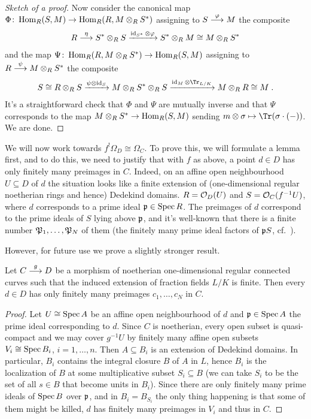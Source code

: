 \documentclass[a4paper,parskip=half,numbers=enddot, DIV=12]{scrreprt}
\begin{document}
\begin{proof}[Sketch of a proof]
	Now consider the canonical map $\Phi\colon \Hom_R(S,M)\morphism\Hom_R(R,M\otimes_RS^*)$ assigning to $S\morphism[\phi]M$ the composite
	\begin{align*}
		R\morphism[\eta]S^*\otimes_RS\xrightarrow{\id_{S^*}\otimes \phi} S^*\otimes_RM\cong M\otimes_RS^*
	\end{align*}
	and the map $\Psi\colon \Hom_R(R,M\otimes_RS^*)\morphism\Hom_R(S,M)$ assigning to $R\morphism[\psi]M\otimes_RS^*$ the composite
	\begin{align*}
		S\cong R\otimes_RS\xrightarrow{\psi\otimes\id_S}M\otimes_RS^*\otimes_RS\xrightarrow{\id_M\otimes \Tr_{L/K}}M\otimes_RR\cong M\;.
	\end{align*}
	It's a straightforward check that $\Phi$ and $\Psi$ are mutually inverse and that $\Psi$ corresponds to the map $M\otimes_RS^*\morphism\Hom_R(S,M)$ sending $m\otimes\sigma\mapsto \Tr(\sigma\cdot(-))$. We are done.	
\end{proof}
We will now work towards $f^!\Omega_D\cong \Omega_C$. To prove this, we will formulate a lemma first, and to do this, we need to justify that with $f$ as above, a point $d\in D$ has only finitely many preimages in $C$. Indeed, on an affine open neighbourhood $U\subseteq D$ of $d$ the situation looks like a finite extension of (one-dimensional regular noetherian rings and hence) Dedekind domains. $R=\mathcal{O}_D(U)$ and $S=\mathcal{O}_C(f^{-1}U)$, where $d$ corresponds to a prime ideal $\mathfrak{p}\in\operatorname{Spec} R$. The preimages of $d$ correspond to the prime ideals of $S$ lying above $\mathfrak{p}$, and it's well-known that there is a finite number $\mathfrak{P}_1,\ldots,\mathfrak{P}_N$ of them (the finitely many prime ideal factors of $\mathfrak{p} S$, cf.\ \cite[Ch.~I, \S 8]{NEUKIRCH}).

However, for future use we prove a slightly stronger result.
\begin{lem}
	Let $C\morphism[g] D$ be a morphism of noetherian one-dimensional regular connected curves such that the induced extension of fraction fields $L/K$ is finite. Then every $d\in D$ has only finitely many preimages $c_1,\ldots,c_N$ in $C$.
\end{lem}
\begin{proof}
	Let $U\cong \operatorname{Spec} A$ be an affine open neighbourhood of $d$ and $\mathfrak{p}\in\operatorname{Spec} A$ the prime ideal corresponding to $d$. Since $C$ is noetherian, every open subset is quasi-compact and we may cover $g^{-1}U$ by finitely many affine open subsets $V_i\cong \operatorname{Spec} B_i$, $i=1,\ldots,n$. Then $A\subseteq B_i$ is an extension of Dedekind domains. In particular, $B_i$ contains the integral closure $B$ of $A$ in $L$, hence $B_i$ is the localization of $B$ at some multiplicative subset $S_i\subseteq B$ (we can take $S_i$ to be the set of all $s\in B$ that become units in $B_i$). Since there are only finitely many prime ideals of $\operatorname{Spec} B$ over $\mathfrak{p}$, and in $B_i=B_{S_i}$ the only thing happening is that some of them might be killed, $d$ has finitely many preimages in $V_i$ and thus in $C$.
\end{proof}
\end{document}
